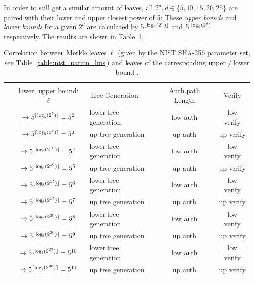 In order to still get a similar amount of leaves, all $2^d, d \in \{5,10,15,20,25\}$ are paired with their lower and upper closest power of 5:
These \textit{upper bounds} and \textit{lower bounds} for a given $2^d$ are calculated by $5^{\lfloor\log_5(2^d)\rfloor}$ and $5^{\lceil\log_5(2^d)\rceil}$ respectively. The results are shown in Table~\ref{table:nist_upper_lower_bound}. 

\begin{table}
\centering
\begin{tabular}{c c l c c} 
 \hline\noalign{\smallskip}
 \multicolumn{5}{c}{\textbf{Merkle Tree - Lower / Upper Bound \extree}} \\
 \noalign{\smallskip} 
 & lower, upper bound: $\ell$ & Tree Generation & Auth.path Length & Verify \\
 \hline\noalign{\smallskip}
 \multirow{2}{*}{$2^5$} & $\rightarrow 5^{\lfloor\log_5(2^5)\rfloor} = 5^{2} $ & lower tree generation & low auth & low verify \\
 & $\rightarrow 5^{\lceil\log_5(2^5)\rceil} = 5^{3}$ & up tree generation & up auth & up verify \\
 \hline\noalign{\smallskip} 
 \multirow{2}{*}{$2^{10}$} & $\rightarrow 5^{\lfloor\log_5(2^{10})\rfloor} = 5^{4}$ & lower tree generation & low auth & low verify \\
 & $\rightarrow 5^{\lceil\log_5(2^{10})\rceil} = 5^{5}$ & up tree generation & up auth & up verify \\
 \hline\noalign{\smallskip} 
 \multirow{2}{*}{$2^{15}$}& $\rightarrow 5^{\lfloor\log_5(2^{15})\rfloor} = 5^{6}$ & lower tree generation & low auth & low verify \\ 
 & $\rightarrow 5^{\lceil\log_5(2^{15})\rceil} = 5^{7}$ & up tree generation & up auth & up verify \\ 
 \hline\noalign{\smallskip} 
 \multirow{2}{*}{$2^{20}$} & $\rightarrow 5^{\lfloor\log_5(2^{20})\rfloor} = 5^{8}$ & lower tree generation & low auth & low verify \\ 
 & $\rightarrow 5^{\lceil\log_5(2^{20})\rceil} = 5^{9}$ & up tree generation & up auth & up verify \\
 \hline\noalign{\smallskip}  
  \multirow{2}{*}{$2^{25}$} & $\rightarrow 5^{\lfloor\log_5(2^{25})\rfloor} =  5^{10}$ & lower tree generation & low auth & low verify \\ 
 & $\rightarrow 5^{\lceil\log_5(2^{25})\rceil} = 5^{11}$ & up tree generation & up auth & up verify \\
 \hline\noalign{\smallskip}
 \end{tabular}
\caption{Correlation between Merkle leaves $\ell$ (given by the NIST SHA-256 parameter set, see Table~\ref{table:nist_param_lms}) and leaves of the corresponding upper / lower bound \extree.}
\label{table:nist_upper_lower_bound}
\end{table}

